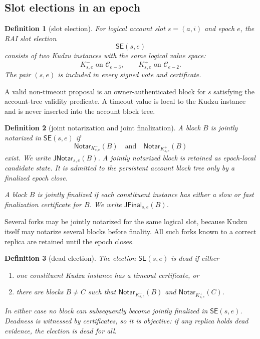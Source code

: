 \documentclass[11pt]{article}
\newtheorem{definition}{Definition}
\theoremstyle{remark}
\newcommand{\C}{\mathcal{C}}
\newcommand{\SE}{\mathsf{SE}}
\newcommand{\Notar}{\mathsf{Notar}}
\newcommand{\JNotar}{\mathsf{JNotar}}
\newcommand{\JFinal}{\mathsf{JFinal}}
\begin{document}
\subsection{Slot elections in an epoch}

\begin{definition}[slot election]
For logical account slot $s=(a,i)$ and epoch $e$, the RAI slot election
\[
  \SE(s,e)
\]
consists of two Kudzu instances with the same logical value space:
\begin{equation}
  K^-_{s,e} \text{ on } \C_{e-3},
  \qquad
  K^+_{s,e} \text{ on } \C_{e-2}.
  \label{eq:joint-committee}
\end{equation}
The pair $(s,e)$ is included in every signed vote and certificate.
\end{definition}

A valid non-timeout proposal is an owner-authenticated block for $s$ satisfying the account-tree validity predicate. A timeout value is local to the Kudzu instance and is never inserted into the account block tree.

\begin{definition}[joint notarization and joint finalization]
A block $B$ is \emph{jointly notarized} in $\SE(s,e)$ if
\[
  \Notar_{K^-_{s,e}}(B)
  \quad\text{and}\quad
  \Notar_{K^+_{s,e}}(B)
\]
exist. We write $\JNotar_{s,e}(B)$. A jointly notarized block is retained as epoch-local candidate state. It is admitted to the persistent account block tree only by a finalized epoch close.

A block $B$ is \emph{jointly finalized} if each constituent instance has either a slow or fast finalization certificate for $B$. We write $\JFinal_{s,e}(B)$.
\end{definition}

Several forks may be jointly notarized for the same logical slot, because Kudzu itself may notarize several blocks before finality. All such forks known to a correct replica are retained until the epoch closes.

\begin{definition}[dead election]
The election $\SE(s,e)$ is \emph{dead} if either
\begin{enumerate}[label=(\roman*),nosep]
  \item one constituent Kudzu instance has a timeout certificate, or
  \item there are blocks $B\ne C$ such that $\Notar_{K^-_{s,e}}(B)$ and $\Notar_{K^+_{s,e}}(C)$.
\end{enumerate}
In either case no block can subsequently become jointly finalized in $\SE(s,e)$. Deadness is witnessed by certificates, so it is objective: if any replica holds dead evidence, the election is dead for all.
\end{definition}
\end{document}
